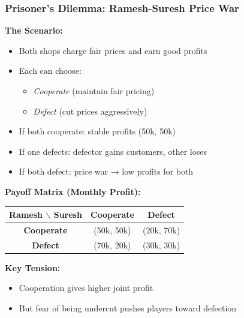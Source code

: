 \begin{frame}[fragile]\frametitle{Prisoner's Dilemma: Ramesh-Suresh Price War}

\textbf{The Scenario:}
\begin{itemize}
  \item Both shops charge fair prices and earn good profits
  \item Each can choose:
  \begin{itemize}
    \item \textit{Cooperate} (maintain fair pricing)
    \item \textit{Defect} (cut prices aggressively)
  \end{itemize}
  
  \item If both cooperate: stable profits (50k, 50k)
  \item If one defects: defector gains customers, other loses
  \item If both defect: price war → low profits for both
\end{itemize}

\vspace{6pt}

\textbf{Payoff Matrix (Monthly Profit):}

\begin{center}
\begin{tabular}{|c|c|c|}
  \hline
  \textbf{Ramesh $\backslash$ Suresh} & \textbf{Cooperate} & \textbf{Defect} \\
  \hline
  \textbf{Cooperate} & (50k, 50k) & (20k, 70k) \\
  \hline
  \textbf{Defect} & (70k, 20k) & (30k, 30k) \\
  \hline
\end{tabular}
\end{center}

\vspace{6pt}

\textbf{Key Tension:}
\begin{itemize}
  \item Cooperation gives higher joint profit
  \item But fear of being undercut pushes players toward defection
\end{itemize}

\end{frame}
